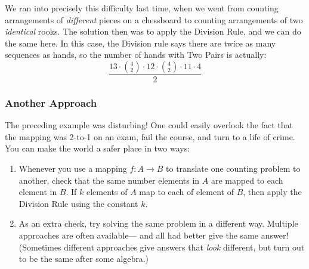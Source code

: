 We ran into precisely this difficulty last time, when we went from
counting arrangements of \emph{different} pieces on a chessboard to
counting arrangements of two \emph{identical} rooks.  The solution
then was to apply the Division Rule, and we can do the same here.  In
this case, the Division rule says there are twice as many sequences
as hands, so the number of hands with Two Pairs is actually:
%
\[
\frac{13 \cdot \binom{4}{2} \cdot 12 \cdot \binom{4}{2} \cdot 11 \cdot 4}{2}
\]

\subsubsection*{Another Approach}

The preceding example was disturbing!  One could easily overlook the
fact that the mapping was 2-to-1 on an exam, fail the course, and turn
to a life of crime.  You can make the world a safer place in two ways:

\begin{enumerate}

\item Whenever you use a mapping $f : A \to B$ to translate one counting
  problem to another, check that the same number elements in $A$ are
  mapped to each element in $B$.  If $k$ elements of $A$ map to each of
  element of $B$, then apply the Division Rule using the constant $k$.

\item As an extra check, try solving the same problem in a different
way.  Multiple approaches are often available--- and all had better
give the same answer!  (Sometimes different approaches give answers
that \emph{look} different, but turn out to be the same after some
algebra.)

\end{enumerate}

